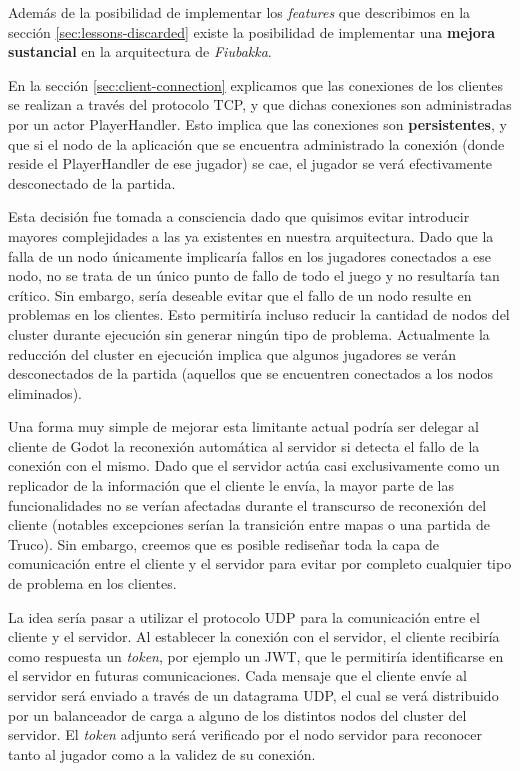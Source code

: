 \noindent Además de la posibilidad de implementar los \textit{features} que describimos en la sección \ref{sec:lessons-discarded}
existe la posibilidad de implementar una \textbf{mejora sustancial} en la arquitectura de \textit{Fiubakka}.

En la sección \ref{sec:client-connection} explicamos que las conexiones de los clientes se realizan a través del protocolo TCP, y que dichas
conexiones son administradas por un actor PlayerHandler. Esto implica que las conexiones son \textbf{persistentes}, y que si el nodo de la aplicación
que se encuentra administrado la conexión (donde reside el PlayerHandler de ese jugador) se cae, el jugador se verá efectivamente desconectado de la partida.

Esta decisión fue tomada a consciencia dado que quisimos evitar introducir mayores complejidades a las ya existentes en nuestra arquitectura. Dado que la falla de un nodo
únicamente implicaría fallos en los jugadores conectados a ese nodo, no se trata de un único punto de fallo de todo el juego y no resultaría tan crítico. Sin embargo, sería
deseable evitar que el fallo de un nodo resulte en problemas en los clientes. Esto permitiría incluso reducir la cantidad de nodos del cluster durante ejecución sin
generar ningún tipo de problema. Actualmente la reducción del cluster en ejecución implica que algunos jugadores se verán desconectados de la partida (aquellos que se encuentren conectados
a los nodos eliminados).

Una forma muy simple de mejorar esta limitante actual podría ser delegar al cliente de Godot la reconexión automática al servidor si detecta el fallo de la conexión con el mismo.
Dado que el servidor actúa casi exclusivamente como un replicador de la información que el cliente le envía, la mayor parte de las funcionalidades no se verían afectadas durante el transcurso
de reconexión del cliente (notables excepciones serían la transición entre mapas o una partida de Truco). Sin embargo, creemos que es posible rediseñar toda la capa de comunicación entre el cliente
y el servidor para evitar por completo cualquier tipo de problema en los clientes.

La idea sería pasar a utilizar el protocolo UDP para la comunicación entre el cliente y el servidor. Al establecer la conexión con el servidor, el cliente recibiría como respuesta un \textit{token}, por ejemplo
un JWT, que le permitiría identificarse en el servidor en futuras comunicaciones. Cada mensaje que el cliente envíe al servidor será enviado a través de un datagrama UDP, el cual se verá distribuido por un balanceador
de carga a alguno de los distintos nodos del cluster del servidor. El \textit{token} adjunto será verificado por el nodo servidor para reconocer tanto al jugador como a la validez de su conexión.

